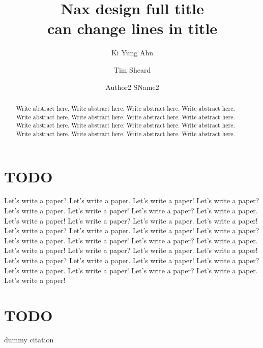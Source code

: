 \documentclass{llncs}
\title{Nax design full title \\ can change lines in title}
\author{Ki Yung Ahn\inst{1} \and Tim Sheard\inst{1} \and
	Author2 SName2\inst{2} %
	}
\institute{
	Portland State University, Portland, Oregon, USA \thanks{TODO thanks} \\
		\email{kya@cs.pdx.edu} \email{sheard@cs.pdx.edu}
	\and
	University of Cambridge, Cambridge, UK \\
		\email{todo@cl.cam.ac.uk} %
	}
\begin{document}
\maketitle
\begin{abstract}
	Write abstract here. Write abstract here.
	Write abstract here. Write abstract here.
	Write abstract here. Write abstract here.
	Write abstract here. Write abstract here.
	Write abstract here. Write abstract here.
	Write abstract here. Write abstract here.
	Write abstract here. Write abstract here.
	Write abstract here. Write abstract here.
\end{abstract}

\section{TODO}
Let's write a paper? Let's write a paper. Let's write a paper!
Let's write a paper? Let's write a paper. Let's write a paper!
Let's write a paper? Let's write a paper. Let's write a paper!
Let's write a paper? Let's write a paper. Let's write a paper!
Let's write a paper? Let's write a paper. Let's write a paper!
Let's write a paper? Let's write a paper. Let's write a paper!
Let's write a paper? Let's write a paper. Let's write a paper!
Let's write a paper? Let's write a paper. Let's write a paper!
Let's write a paper? Let's write a paper. Let's write a paper!
Let's write a paper? Let's write a paper. Let's write a paper!
Let's write a paper? Let's write a paper. Let's write a paper!

\section{TODO}
\cite{Girard72} dummy citation
\cite{AhnShe11}



\end{document}

